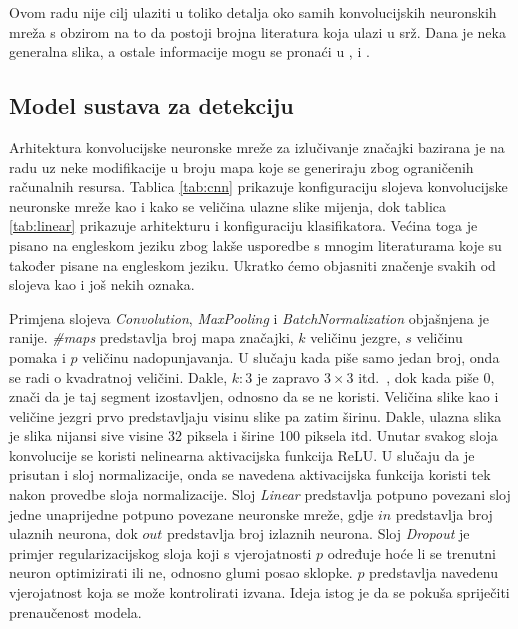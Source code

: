 \documentclass[times, utf8, diplomski]{fer}
\begin{document}
Ovom radu nije cilj ulaziti u toliko detalja oko samih konvolucijskih neuronskih mreža s obzirom na to da postoji brojna literatura koja ulazi u srž. Dana je neka generalna slika, a ostale informacije mogu se pronaći u \citep{guide-cnn}, \citep{Goodfellow-et-al-2016} i \citep{szeliski}.

\subsection{Model sustava za detekciju}
Arhitektura konvolucijske neuronske mreže za izlučivanje značajki bazirana je na radu \citep{crnn-paper} uz neke modifikacije u broju mapa koje se generiraju zbog ograničenih računalnih resursa. Tablica \ref{tab:cnn} prikazuje konfiguraciju slojeva konvolucijske neuronske mreže kao i kako se veličina ulazne slike mijenja, dok tablica \ref{tab:linear} prikazuje arhitekturu i konfiguraciju klasifikatora. Većina toga je pisano na engleskom jeziku zbog lakše usporedbe s mnogim literaturama koje su također pisane na engleskom jeziku. Ukratko ćemo objasniti značenje svakih od slojeva kao i još nekih oznaka.

Primjena slojeva \textit{Convolution}, \textit{MaxPooling} i \textit{BatchNormalization} objašnjena je ranije. \textit{\#maps} predstavlja broj mapa značajki, $k$ veličinu jezgre, $s$ veličinu pomaka i $p$ veličinu nadopunjavanja. U slučaju kada piše samo jedan broj, onda se radi o kvadratnoj veličini. Dakle, $k:3$ je zapravo $3\times3$ itd.\ , dok kada piše 0, znači da je taj segment izostavljen, odnosno da se ne koristi. Veličina slike kao i veličine jezgri prvo predstavljaju visinu slike pa zatim širinu. Dakle, ulazna slika je slika nijansi sive visine 32 piksela i širine 100 piksela itd. Unutar svakog sloja konvolucije se koristi nelinearna aktivacijska funkcija ReLU. U slučaju da je prisutan i sloj normalizacije, onda se navedena aktivacijska funkcija koristi tek nakon provedbe sloja normalizacije. Sloj \textit{Linear} predstavlja potpuno povezani sloj jedne unaprijedne potpuno povezane neuronske mreže, gdje $in$ predstavlja broj ulaznih neurona, dok $out$ predstavlja broj izlaznih neurona. Sloj \textit{Dropout} je primjer regularizacijskog  sloja koji s vjerojatnosti $p$ određuje hoće li se trenutni neuron optimizirati ili ne, odnosno glumi posao sklopke. $p$ predstavlja navedenu vjerojatnost koja se može kontrolirati izvana. Ideja istog je da se pokuša spriječiti prenaučenost  modela.

\bigskip
\end{document}
